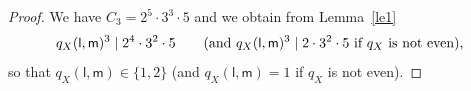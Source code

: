 \documentclass[12pt]{amsart}
\def\Z{{\bf Z}}
\theoremstyle{remark}
\def\lll{\ensuremath{\mathsf l}}
\def\mm{\ensuremath{\mathsf m}}
\begin{document}
\begin{proof}
% 
 We have $C_3=2^5\cdot 3^3\cdot 5$ and we obtain   from Lemma~\ref{le1}
\begin{equation*}\label{eqdiv3}
q_X(\lll,\mm)^3\mid    2^4\cdot 3^2\cdot 5 \qquad\textnormal{(and $ q_X(\lll,\mm)^3 \mid 2 \cdot 3^2\cdot 5 $ if $q_X$ is not even),}
\end{equation*}
so that $ q_X(\lll,\mm)\in\{1,2\}$ (and $ q_X(\lll,\mm)=1 $ if $q_X$ is not even).
 

\end{proof}
\end{document}
